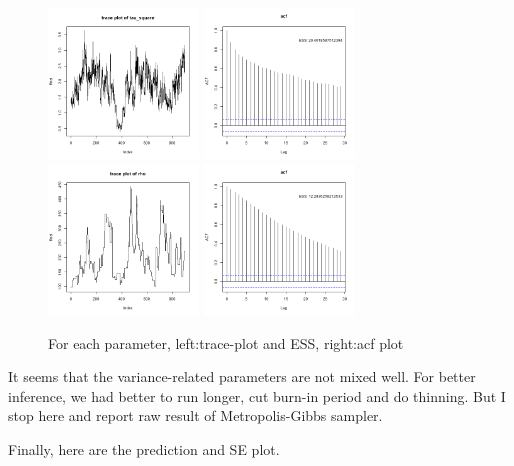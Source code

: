 \documentclass{article}
\begin{document}
\begin{figure}[!h]
    \includegraphics[width=4cm]{prob2_tau_square_traceplot.png}
    \includegraphics[width=4cm]{prob2_tau_square_acf.png}
    \includegraphics[width=4cm]{prob2_rho_traceplot.png}
    \includegraphics[width=4cm]{prob2_rho_acf.png}
    \caption{For each parameter, left:trace-plot and ESS, right:acf plot}
\end{figure}

It seems that the variance-related parameters are not mixed well. 
For better inference, we had better to run longer, cut burn-in period and do thinning.
But I stop here and report raw result of Metropolis-Gibbs sampler.

\clearpage
Finally, here are the prediction and SE plot.
\end{document}
